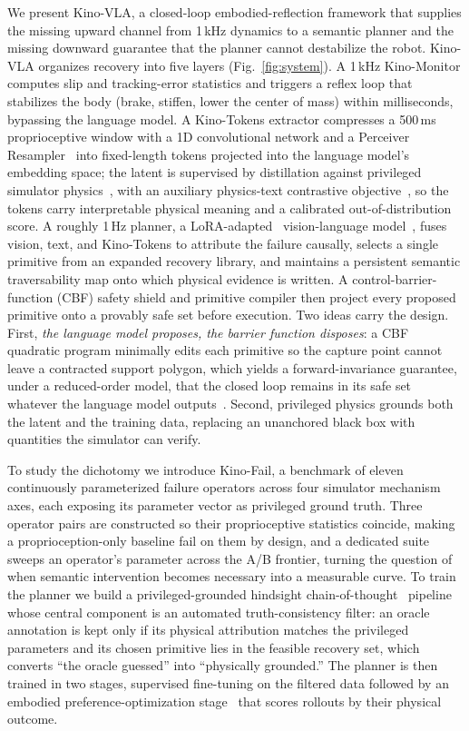 \documentclass[conference]{IEEEtran}
\newcommand{\kinovla}{Kino-VLA}
\newcommand{\kinofail}{Kino-Fail}
\newcommand{\kinotokens}{Kino-Tokens}
\begin{document}
We present \kinovla{}, a closed-loop embodied-reflection framework that supplies
the missing upward channel from \mbox{1\,kHz} dynamics to a semantic planner and
the missing downward guarantee that the planner cannot destabilize the robot.
\kinovla{} organizes recovery into five layers (Fig.~\ref{fig:system}). A \mbox{1\,kHz} Kino-Monitor
computes slip and tracking-error statistics and triggers a reflex loop that
stabilizes the body (brake, stiffen, lower the center of mass) within
milliseconds, bypassing the language model. A \kinotokens{} extractor compresses
a \mbox{500\,ms} proprioceptive window with a 1D convolutional network and a
Perceiver Resampler~\cite{jaegle2021perceiver,alayrac2022flamingo} into
fixed-length tokens projected into the language model's embedding space; the
latent is supervised by distillation against privileged simulator
physics~\cite{chen2020cheating,kumar2021rma}, with an auxiliary physics-text
contrastive objective~\cite{oord2018cpc}, so the tokens carry interpretable
physical meaning and a calibrated out-of-distribution score. A roughly
\mbox{1\,Hz} planner, a LoRA-adapted~\cite{hu2022lora} vision-language
model~\cite{bai2025qwen3vl,wang2024qwen2vl}, fuses vision, text, and
\kinotokens{} to attribute the failure causally, selects a single primitive from
an expanded recovery library, and maintains a persistent semantic traversability
map onto which physical evidence is written. A control-barrier-function (CBF)
safety shield and primitive compiler then project every proposed primitive onto a
provably safe set before execution. Two ideas carry the design. First,
\emph{the language model proposes, the barrier function disposes}: a CBF quadratic
program minimally edits each primitive so the capture point cannot leave a
contracted support polygon, which yields a forward-invariance guarantee, under a
reduced-order model, that the closed loop remains in its safe set whatever the
language model outputs~\cite{ames2017control,pratt2006capture}. Second, privileged
physics grounds both the latent and the training data, replacing an unanchored
black box with quantities the simulator can verify.

To study the dichotomy we introduce \kinofail{}, a benchmark of eleven
continuously parameterized failure operators across four simulator mechanism
axes, each exposing its parameter vector as privileged ground truth. Three
operator pairs are constructed so their proprioceptive statistics coincide,
making a proprioception-only baseline fail on them by design, and a dedicated
suite sweeps an operator's parameter across the A/B frontier, turning the
question of when semantic intervention becomes necessary into a measurable curve.
To train the planner we build a privileged-grounded hindsight
chain-of-thought~\cite{wei2022chain} pipeline whose central component is an
automated truth-consistency filter: an oracle annotation is kept only if its
physical attribution matches the privileged parameters and its chosen primitive
lies in the feasible recovery set, which converts ``the oracle guessed'' into
``physically grounded.'' The planner is then trained in two stages, supervised
fine-tuning on the filtered data followed by an embodied preference-optimization
stage~\cite{rafailov2023dpo} that scores rollouts by their physical outcome.
\end{document}

